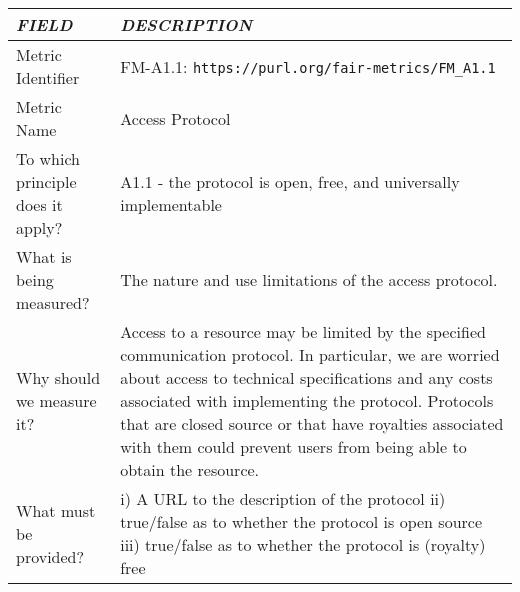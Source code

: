 \documentclass[english]{article}
\begin{document}
\newpage









\begin{longtable}{|p{5cm}|p{9cm}|}


\hline
\emph{FIELD} & \emph{DESCRIPTION} \\
\hline
Metric Identifier &   FM-A1.1: \verb"https://purl.org/fair-metrics/FM_A1.1"
 \\


\hline
Metric Name &   



Access Protocol




 \\



\hline
To which principle does it apply? &   

A1.1 - the protocol is open, free, and universally implementable

\\



\hline
What is being measured? & 


The nature and use limitations of the access protocol.


\\



\hline
Why should we measure it? & 



Access to a resource may be limited by the specified communication protocol. In particular, we are worried about access to technical specifications and any costs associated with implementing the protocol. Protocols that are closed source or that have royalties associated with them could prevent users from being able to obtain the resource.
  
\\



\hline
What must be provided? &  


i) A URL to the description of the protocol\newline  
ii) true/false as to whether the protocol is open source\newline 
iii) true/false as to whether the protocol is (royalty) free\newline 





\end{longtable}
\end{document}
